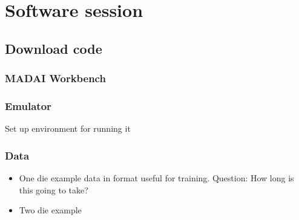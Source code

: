 \documentclass{article}
\begin{document}
\section{Software session}

\subsection{Download code}

\subsubsection{MADAI Workbench}

\subsubsection{Emulator}

Set up environment for running it

\subsubsection{Data}

\begin{itemize}

\item One die example data in format useful for training. Question: How long is this going to take?

\item Two die example

\end{itemize}
\end{document}
